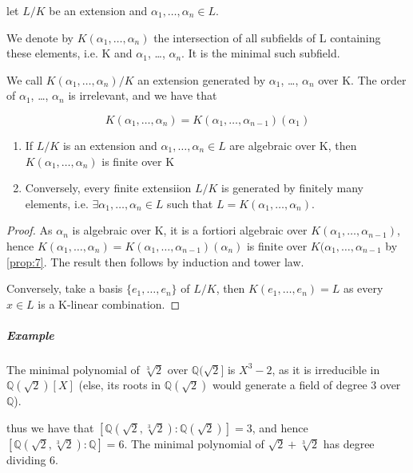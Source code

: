 \begin{definition}\label{def:9}
  let $L/K$ be an extension and $\alpha_1, \ldots, \alpha_n \in L$. 

  We denote by $K(\alpha_1, \ldots ,\alpha_n)$ the intersection of all subfields of L containing these elements, i.e. K and $\alpha_1$, \ldots, $\alpha_n$. It is the minimal such subfield.

  We call $K(\alpha_1, \ldots, \alpha_n)/K$ an extension generated by $\alpha_1$, \ldots, $\alpha_n$ over K. The order of $\alpha_1$, \ldots, $\alpha_n$ is irrelevant, and we have that

  \begin{equation*}
    K(\alpha_1, \ldots, \alpha_n) = K(\alpha_1, \ldots, \alpha_{n-1})(\alpha_1)
  \end{equation*}
\end{definition}

\begin{proposition}\label{prop:10}
  \begin{enumerate}
  \item If $L/K$ is an extension and $\alpha_1, \ldots, \alpha_n \in L$ are algebraic over K, then $K(\alpha_1, \ldots, \alpha_n)$ is finite over K
  \item Conversely, every finite extensiion $L/K$ is generated by finitely many elements, i.e. $\exists \alpha_1, \ldots, \alpha_n \in L$ such that $L = K(\alpha_1, \ldots, \alpha_n)$.
  \end{enumerate}
\end{proposition}

\begin{proof}
  As $\alpha_n$ is algebraic over K, it is a fortiori algebraic over $K(\alpha_1, \ldots, \alpha_{n-1})$, hence $K(\alpha_1, \ldots, \alpha_n) = K(\alpha_1, \ldots, \alpha_{n-1})(\alpha_n)$ is finite over $K(\alpha_1, \ldots, \alpha_{n-1}$ by \autoref{prop:7}. The result then follows by induction and tower law.

Conversely, take a basis $\{e_1, \ldots, e_n\}$ of $L/K$, then $K(e_1, \ldots, e_n) = L$ as every $x \in L$ is a K-linear combination. 
\end{proof}

\subparagraph{Example}
The minimal polynomial of $\sqrt[3]{2}$ over $\mathbb{Q}(\sqrt{2}]$ is $X^3 -2$, as it is irreducible in $\mathbb{Q}(\sqrt{2})[X]$ (else, its roots in $\mathbb{Q}(\sqrt{2})$ would generate a field of degree 3 over $\mathbb{Q}$).
\begin{figure}[H]
  \centering
\end{figure}
thus we have that $[\mathbb{Q}(\sqrt{2}, \sqrt[3]{2}) : \mathbb{Q}(\sqrt{2})] = 3$, and hence $[\mathbb{Q}(\sqrt{2}, \sqrt[3]{2}) : \mathbb{Q}] = 6$. The minimal polynomial of $\sqrt{2} + \sqrt[3]{2}$ has degree dividing 6.


